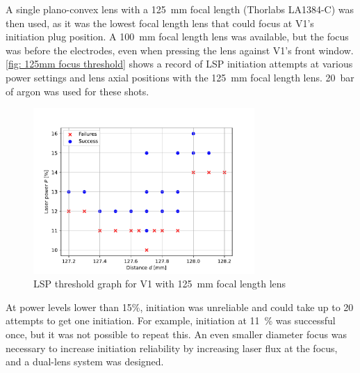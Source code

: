             A single plano-convex lens with a \qty{125}{mm} focal length (Thorlabs LA1384-C) was then used, as it was the lowest focal length lens that could focus at V1's initiation plug position. A \qty{100}{mm} focal length lens was available, but the focus was before the electrodes, even when pressing the lens against V1's front window. \autoref{fig: 125mm focus threshold} shows a record of LSP initiation attempts at various power settings and lens axial positions with the \qty{125}{mm} focal length lens. \qty{20}{bar} of argon was used for these shots.
            \begin{figure}[!ht]
                \centering
                \includegraphics[width=0.75\textwidth]{assets/4 experiments/125mm_focus_threshold.pdf}
                \caption{LSP threshold graph for V1 with \qty{125}{mm} focal length lens}
                \label{fig: 125mm focus threshold}
            \end{figure}
            At power levels lower than 15\%, initiation was unreliable and could take up to 20 attempts to get one initiation. For example, initiation at \qty{11}{\%} was successful once, but it was not possible to repeat this. An even smaller diameter focus was necessary to increase initiation reliability by increasing laser flux at the focus, and a dual-lens system was designed.

